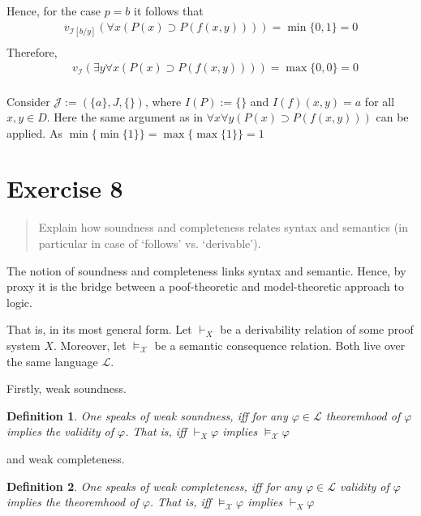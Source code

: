 \documentclass[11pt,a4paper]{article}
\newtheorem{mydef}{Definition}
\begin{document}
\begin{itemize}
Hence, for the case $p=b$ it follows that
\begin{equation*}
\begin{split}
v_{\mathcal{I}[b/y]}( \forall  x (P(x) \supset P(f(x,y)))) = \min \{ 0,1 \} = 0 \\
\end{split}
\end{equation*}
Therefore,
\begin{equation*}
\begin{split}
&v_{\mathcal{I}}( \exists  y \forall x (P(x) \supset P(f(x,y))))= \max \{ 0,0 \} =0\\
\end{split}
\end{equation*}


Consider $\mathcal{J}:=(\{a\}, J, \{\})$, where $I(P):=\{\}$ and $I(f)(x,y)=a$ for all $x,y \in D$.
Here the same argument as in  $\forall x \forall  y (P(x) \supset P(f(x,y)))$ can be applied. As $\min \{\min \{ 1 \} \} = \max \{\max \{ 1 \} \} = 1 $

\end{itemize}


\section*{Exercise 8}
\begin{quote}
Explain how soundness and completeness relates syntax and semantics (in particular in case of ‘follows’ vs. ‘derivable’).
\end{quote}

The notion of soundness and completeness links syntax and semantic. Hence, by proxy it is the bridge between a poof-theoretic and model-theoretic approach to logic.

That is, in its most general form. Let $\vdash_X$ be a derivability relation of some proof system $X$. Moreover, let $\models_{\mathcal{X}}$ be a semantic consequence relation. Both live over the same language $\mathcal{L}$. 

Firstly, weak soundness.
\begin{mydef}
One speaks of weak soundness, iff for any $\varphi \in \mathcal{L}$ theoremhood of $\varphi$ implies the validity of $\varphi$. That is, iff  $\vdash_X \varphi$ implies $\vDash_{\mathcal{X}} \varphi$
\end{mydef}
and weak completeness.
\begin{mydef}
One speaks of weak completeness, iff for any $\varphi \in \mathcal{L}$ validity of $\varphi$ implies the theoremhood of $\varphi$. That is, iff  $\vDash_{\mathcal{X}} \varphi$ implies $\vdash_X \varphi$
\end{mydef}
\end{document}
